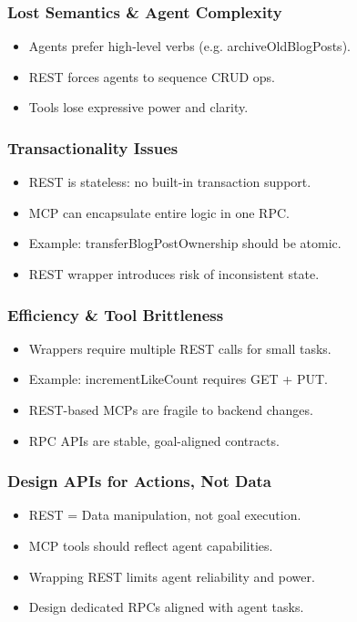\begin{frame}[fragile]\frametitle{Lost Semantics \& Agent Complexity}
\begin{itemize}
  \item Agents prefer high-level verbs (e.g. archiveOldBlogPosts).
  \item REST forces agents to sequence CRUD ops.
  \item Tools lose expressive power and clarity.
\end{itemize}
\end{frame}

\begin{frame}[fragile]\frametitle{Transactionality Issues}
\begin{itemize}
  \item REST is stateless: no built-in transaction support.
  \item MCP can encapsulate entire logic in one RPC.
  \item Example: transferBlogPostOwnership should be atomic.
  \item REST wrapper introduces risk of inconsistent state.
\end{itemize}
\end{frame}

\begin{frame}[fragile]\frametitle{Efficiency \& Tool Brittleness}
\begin{itemize}
  \item Wrappers require multiple REST calls for small tasks.
  \item Example: incrementLikeCount requires GET + PUT.
  \item REST-based MCPs are fragile to backend changes.
  \item RPC APIs are stable, goal-aligned contracts.
\end{itemize}
\end{frame}

\begin{frame}[fragile]\frametitle{Design APIs for Actions, Not Data}
\begin{itemize}
  \item REST = Data manipulation, not goal execution.
  \item MCP tools should reflect agent capabilities.
  \item Wrapping REST limits agent reliability and power.
  \item Design dedicated RPCs aligned with agent tasks.
\end{itemize}
\end{frame}

